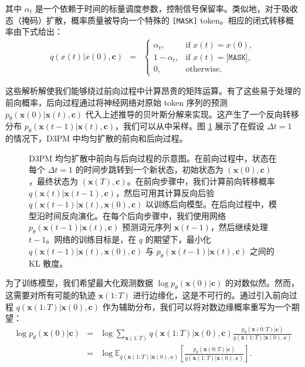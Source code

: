 \documentclass[UTF8,a4paper,zihao=-4,oneside,openany]{ctexbook}
\makeatletter
\newcommand{\AMLFigure}[2][0.96\linewidth]{%
  \begingroup
  \let\AtBeginDocument\@gobble
  \endgroup
}
\makeatother
\begin{document}
\noindent 其中 $\alpha_t$ 是一个依赖于时间的标量调度参数，控制信号保留率。类似地，对于吸收态（掩码）扩散，概率质量被导向一个特殊的 \texttt{[MASK]} token。相应的闭式转移概率由下式给出：
\begin{eqnarray}
q(x(t) | x(0), \mathbf{c}) & = & \begin{cases} \alpha_t, & \text{if } x(t) = x(0), \\ 1 - \alpha_t, & \text{if } x(t) = \texttt{[MASK]}, \\ 0, & \text{otherwise.} \end{cases}
\end{eqnarray}

这些解析解使我们能够绕过前向过程中计算昂贵的矩阵运算。有了这些易于处理的前向概率，后向过程通过将神经网络对原始 token 序列的预测 $p_\theta(\mathbf{x}(0) | \mathbf{x}(t), \mathbf{c})$ 代入上述推导的贝叶斯分解来实现。这产生了一个反向转移分布 $p_\theta(\mathbf{x}(t - 1) | \mathbf{x}(t), \mathbf{c})$，我们可以从中采样。图 \ref{fig:d3pm-forward-and-reverse-processes} 展示了在假设 $\Delta t = 1$ 的情况下，D3PM 中均匀扩散的前向和后向过程。

\begin{figure}[!t]
\centering
\AMLFigure{figure-d3pm-forward-and-reverse-processes}
\caption{D3PM 均匀扩散中前向与后向过程的示意图。在前向过程中，状态在每个 $\Delta t = 1$ 的时间步跳转到一个新状态，初始状态为 $(\mathbf{x}(0), \mathbf{c})$，最终状态为 $(\mathbf{x}(T), \mathbf{c})$。在前向步骤中，我们计算前向转移概率 $q(\mathbf{x}(t) | \mathbf{x}(t - 1), \mathbf{c})$，然后可用其计算反向后验 $q(\mathbf{x}(t-1)| \mathbf{x}(t),\mathbf{x}(0),\mathbf{c})$ 以训练后向模型。在后向过程中，模型沿时间反向演化。在每个后向步骤中，我们使用网络 $p_\theta(\mathbf{x}(t-1)| \mathbf{x}(t),\mathbf{c})$ 预测词元序列 $\mathbf{x}(t-1)$，然后继续处理 $t - 1$。网络的训练目标是，在 $q$ 的期望下，最小化 $q(\mathbf{x}(t-1)| \mathbf{x}(t),\mathbf{x}(0),\mathbf{c})$ 与 $p_\theta(\mathbf{x}(t-1)| \mathbf{x}(t),\mathbf{c})$ 之间的 KL 散度。}
\label{fig:d3pm-forward-and-reverse-processes}
\end{figure}

为了训练模型，我们希望最大化观测数据 $\log p_\theta(\mathbf{x}(0) | \mathbf{c})$ 的对数似然。然而，这需要对所有可能的轨迹 $\mathbf{x}(1{:}T)$ 进行边缘化，这是不可行的。通过引入前向过程 $q(\mathbf{x}(1{:}T) | \mathbf{x}(0), \mathbf{c})$ 作为辅助分布，我们可以将对数边缘概率重写为一个期望：
\begin{eqnarray}
\log p_\theta(\mathbf{x}(0) | \mathbf{c}) & = & \log\sum_{\mathbf{x}(1{:}T)} q(\mathbf{x}(1{:}T) | \mathbf{x}(0), \mathbf{c}) \frac{p_\theta(\mathbf{x}(0{:}T) | \mathbf{c})}{q(\mathbf{x}(1{:}T) | \mathbf{x}(0), \mathbf{c})} \nonumber \\
& = & \log \mathbb{E}_{q(\mathbf{x}(1{:}T) | \mathbf{x}(0), \mathbf{c})} \left[ \frac{p_\theta(\mathbf{x}(0{:}T) | \mathbf{c})}{q(\mathbf{x}(1{:}T) | \mathbf{x}(0), \mathbf{c})} \right].
\end{eqnarray}
\end{document}
